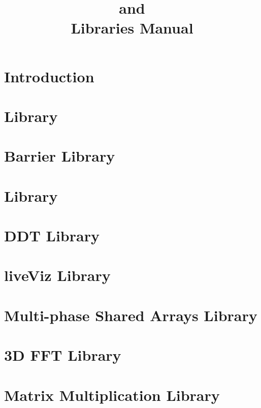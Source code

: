\documentclass[10pt]{report}
\title{\converse{} and \charmpp{}\\ Libraries Manual}
\begin{document}
\maketitle

\chapter{Introduction}

\chapter{\irecv{} Library}

\chapter{Barrier Library}

\chapter{\tempo{} Library}

\chapter{DDT Library}

\chapter{liveViz Library}

\chapter{Multi-phase Shared Arrays Library}

\chapter{3D FFT Library}

\chapter{Matrix Multiplication Library}



\end{document}

